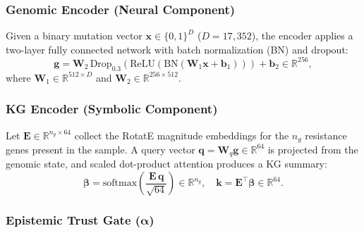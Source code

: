 \documentclass[conference]{IEEEtran}
\begin{document}
\subsubsection{Genomic Encoder (Neural Component)}

Given a binary mutation vector $\mathbf{x} \in \{0,1\}^{D}$ ($D{=}17{,}352$), the encoder applies a two-layer fully connected network with batch normalization (BN) and dropout:
\begin{equation}
  \mathbf{g} = \mathbf{W}_2\,\text{Drop}_{0.3}\!\left(
    \text{ReLU}\!\left(\text{BN}\!\left(
    \mathbf{W}_1 \mathbf{x} + \mathbf{b}_1\right)\right)\right)
    + \mathbf{b}_2 \in \mathbb{R}^{256},
\end{equation}
where $\mathbf{W}_1 \in \mathbb{R}^{512 \times D}$ and $\mathbf{W}_2 \in \mathbb{R}^{256 \times 512}$.

\subsubsection{KG Encoder (Symbolic Component)}

Let $\mathbf{E} \in \mathbb{R}^{n_g \times 64}$ collect the RotatE magnitude embeddings for the $n_g$ resistance genes present in the sample. A query vector $\mathbf{q} = \mathbf{W}_q \mathbf{g} \in \mathbb{R}^{64}$ is projected from the genomic state, and scaled dot-product attention produces a KG summary:
\begin{equation}
  \boldsymbol{\beta} = \text{softmax}\!\left(\frac{\mathbf{E}\,\mathbf{q}}
    {\sqrt{64}}\right) \in \mathbb{R}^{n_g}, \quad
  \mathbf{k} = \mathbf{E}^\top \boldsymbol{\beta} \in \mathbb{R}^{64}.
\end{equation}

\subsubsection{Epistemic Trust Gate ($\boldsymbol{\alpha}$)}
\end{document}
